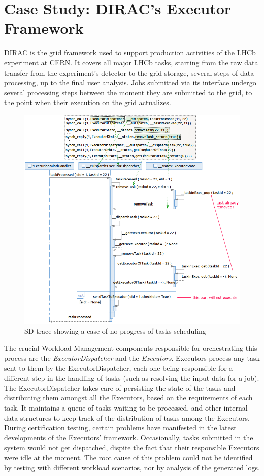 \documentclass[letter]{llncs}
\newcommand{\figshrink}{\vspace{-.6cm}}
\newcommand{\figshrinkend}{}
\newcommand{\subsecshrinkbegin}{\vspace{-.2cm}}
\begin{document}
\section{Case Study: DIRAC’s Executor Framework}
\label{sec:Application}
\subsecshrinkbegin
DIRAC \cite{DIRAC_CommGridSolution} is the grid framework used to support production activities of the LHCb experiment at CERN.
It covers all major LHCb tasks, starting from the raw data transfer from the experiment’s detector to the grid storage, several steps of data processing, up
to the final user analysis.
Jobs submitted via its interface undergo several processing steps between the moment they are submitted to the grid, 
to the point when their execution on the grid actualizes. 
\begin{figure}[!t]
\centering
\figshrink
\includegraphics[width=1.0\linewidth,keepaspectratio=true]{./TraceNew1.png}
\caption{SD trace showing a case of no-progress of tasks scheduling}
\label{fig:noProgress}
\figshrinkend
\end{figure}
The crucial Workload Management components responsible for orchestrating this process are the \emph{ExecutorDispatcher} and 
the \emph{Executors}. Executors process any task sent to them by the ExecutorDispatcher, each one being responsible for a different step in the handling of tasks
(such as resolving the input data for a job).
The ExecutorDispatcher takes care of persisting the state of the tasks and distributing them amongst all the Executors, based on the
requirements of each task. It maintains a queue of tasks waiting to be processed, and other internal data structures to keep track
of the distribution of tasks among the Executors.
During certification testing, certain problems have manifested in the latest developments of the Executors' framework.
Occasionally, tasks submitted in the system would not get dispatched, dispite the fact that their responsible Executors
were idle at the moment.
The root cause of this problem could not be identified by testing  with different workload scenarios, nor by analysis of the 
generated logs. 
\end{document}
